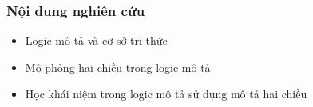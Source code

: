 \documentclass[fleqn]{beamer}
\begin{document}
\begin{frame}\frametitle{\bf Nội dung nghiên cứu}
\begin{itemize}
  \item Logic mô tả và cơ sở tri thức
  \vspace{1.5ex}
  \item Mô phỏng hai chiều trong logic mô tả
  \vspace{1.5ex}
  \item Học khái niệm trong logic mô tả sử dụng mô tả hai chiều
\end{itemize}
\end{frame}
\end{document}
